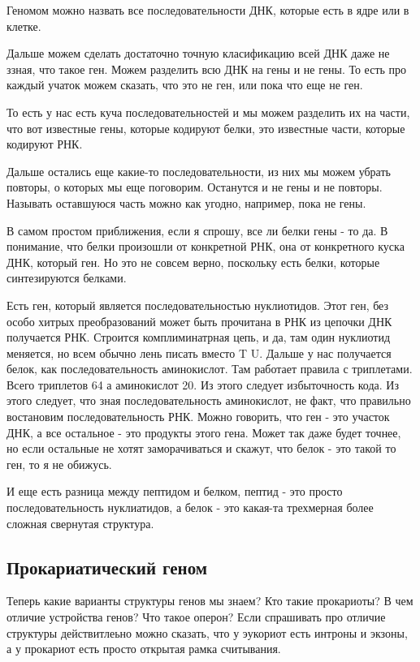 Геномом можно назвать все последовательности ДНК, которые есть 
в ядре или в клетке. 

Дальше можем сделать достаточно точную класификацию 
всей ДНК даже не ззная, что такое ген. Можем разделить 
всю ДНК на гены и не гены. То есть про каждый учаток можем сказать, 
что это не ген, или пока что еще не ген. 

То есть у нас есть куча последовательностей и мы можем разделить их 
на части, что вот известные гены, которые кодируют белки, 
это известные части, которые кодируют РНК. 

Дальше остались еще какие-то последовательности, из 
них мы можем убрать повторы, о которых мы еще поговорим. Останутся и 
не гены и не повторы. Называть оставшуюся часть можно как угодно, 
например, пока не гены. 

В самом простом приближения, если я 
спрошу, все ли белки гены - то да. В понимание, что 
белки произошли от конкретной РНК, она от конкретного 
куска ДНК, который ген. Но это не совсем верно, 
поскольку есть белки, которые синтезируются белками. 

Есть ген, который является последовательностью нуклиотидов. 
Этот ген, без особо хитрых преобразований может быть прочитана 
в РНК из цепочки ДНК получается РНК. Строится комплиминатрная цепь, 
и да, там один нуклиотид меняется, но всем обычно лень писать 
вместо T U. Дальше у нас 
получается белок, как последовательность аминокислот. 
Там работает правила с триплетами. Всего 
триплетов 64 а аминокислот 20. Из этого 
следует избыточность кода. Из этого следует, что 
зная последовательность аминокислот, не факт, что правильно востановим 
последовательность РНК. Можно говорить, что ген - это участок ДНК,
а все остальное - это продукты этого гена. Может так даже будет точнее, 
но если остальные не хотят заморачиваться и скажут, что белок - это 
такой то ген, то я не обижусь. 

И еще есть разница между пептидом и белком, пептид - это просто 
последовательность нуклиатидов, а белок - это какая-та трехмерная 
более сложная свернутая структура. 

\subsection{Прокариатический геном}
Теперь какие варианты структуры генов мы знаем? 
Кто такие прокариоты? 
В чем отличие устройства генов? 
Что такое оперон? 
Если спрашивать про отличие структуры действитлеьно 
можно сказать, что у эукориот есть интроны и экзоны, 
а у прокариот есть просто 
открытая рамка считывания. 

